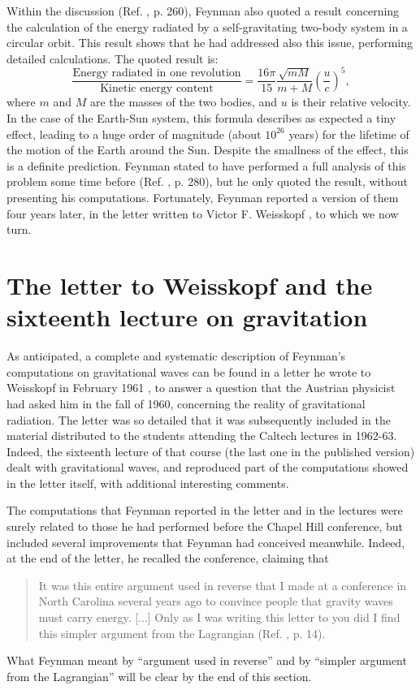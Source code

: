 \documentclass{ws-procs961x669}            %
\begin{document}
Within the discussion (Ref. , p. 260), Feynman
also quoted a result concerning the calculation of the energy
radiated by a self-gravitating two-body system in a circular
orbit. This result shows that he had addressed also this issue,
performing detailed calculations. The quoted result is:
%
\begin{equation}\label{doublestar}
\frac{\text{Energy radiated in one revolution}}{\text{Kinetic
energy content}}=\frac{16 \pi}{15} \frac{\sqrt{mM}}{m+M} \left(
\frac{u}{c} \right)^5,
\end{equation}
%
where $m$ and $M$ are the masses of the two bodies, and $u$ is
their relative velocity. In the case of the Earth-Sun system, this
formula describes as expected a tiny effect, leading to a huge
order of magnitude (about $10^{26}$ years) for the lifetime of the
motion of the Earth around the Sun. Despite the smallness of the
effect, this is a definite prediction. Feynman stated to have
performed a full analysis of this problem some time before (Ref.
, p. 280), but he only quoted the result,
without presenting his computations. Fortunately, Feynman reported
a version of them four years later, in the letter written to
Victor F. Weisskopf \cite{WeisskopfLetter}, to which we now turn.


\section{The letter to Weisskopf and the sixteenth lecture on
gravitation}\label{WeisskopfLetter}


As anticipated, a complete and systematic description of Feynman's
computations on gravitational waves can be found in a letter he
wrote to Weisskopf in February 1961 \cite{WeisskopfLetter}, to
answer a question that the Austrian physicist had asked him in the
fall of 1960, concerning the reality of gravitational radiation.
The letter was so detailed that it was subsequently included in
the material distributed to the students attending the Caltech
lectures in 1962-63. Indeed, the sixteenth lecture of that course
(the last one in the published version\cite{Feynman:1996kb}) dealt
with gravitational waves, and reproduced part of the computations
showed in the letter itself, with additional interesting comments.

The computations that Feynman reported in the letter and in the
lectures were surely related to those he had performed before the
Chapel Hill conference, but included several improvements that
Feynman had conceived meanwhile. Indeed, at the end of the letter,
he recalled the conference, claiming that
%
\begin{quote}
It was this entire argument used in reverse that I made at a
conference in North Carolina several years ago to convince people
that gravity waves must carry energy. [...] Only as I was writing
this letter to you did I find this simpler argument from the
Lagrangian (Ref. , p. 14).
\end{quote}
%
What Feynman meant by ``argument used in reverse'' and by
``simpler argument from the Lagrangian'' will be clear by the end
of this section.
\end{document}
